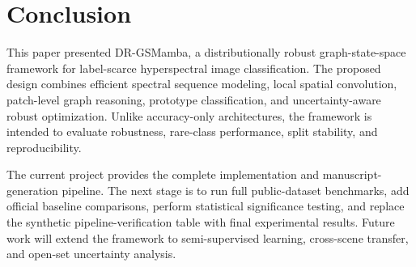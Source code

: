 \section{Conclusion}
This paper presented DR-GSMamba, a distributionally robust graph-state-space framework for label-scarce hyperspectral image classification. The proposed design combines efficient spectral sequence modeling, local spatial convolution, patch-level graph reasoning, prototype classification, and uncertainty-aware robust optimization. Unlike accuracy-only architectures, the framework is intended to evaluate robustness, rare-class performance, split stability, and reproducibility.

The current project provides the complete implementation and manuscript-generation pipeline. The next stage is to run full public-dataset benchmarks, add official baseline comparisons, perform statistical significance testing, and replace the synthetic pipeline-verification table with final experimental results. Future work will extend the framework to semi-supervised learning, cross-scene transfer, and open-set uncertainty analysis.
